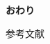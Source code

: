 \nofootertrue
\begin{frame}
    \vfill
    \centering
    {\Huge \textbf{おわり}}
    \vfill
\end{frame}

\nocite{*}
\begin{frame}{参考文献}
    \scriptsize
    \printbibliography[heading=none]
\end{frame}

